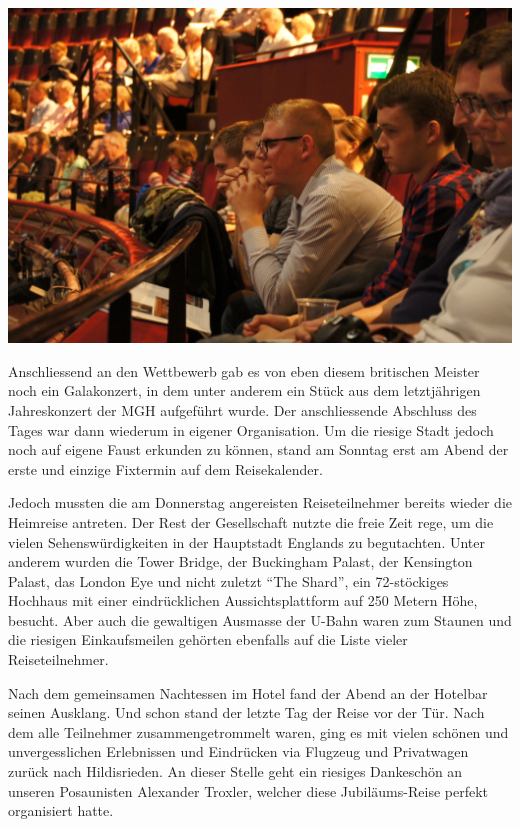\begin{history}
    \begin{MulticolFigure}
        \centering
        \includegraphics[width=0.93\linewidth]{./chap/2001-2024/2014/Britisch-Open-Royal-Alber-Hall.jpg}
    \end{MulticolFigure}

    Anschliessend an den Wettbewerb gab es von eben diesem britischen Meister
    noch ein Galakonzert, in dem unter anderem ein Stück aus dem letztjährigen
    Jahreskonzert der MGH aufgeführt wurde. Der anschliessende Abschluss des
    Tages war dann wiederum in eigener Organisation. Um die riesige Stadt jedoch
    noch auf eigene Faust erkunden zu können, stand am Sonntag erst am Abend der
    erste und einzige Fixtermin auf dem Reisekalender.

    Jedoch mussten die am Donnerstag angereisten Reiseteilnehmer bereits wieder
    die Heimreise antreten. Der Rest der Gesellschaft nutzte die freie Zeit
    rege, um die vielen Sehenswürdigkeiten in der Hauptstadt Englands zu
    begutachten. Unter anderem wurden die Tower Bridge, der Buckingham Palast,
    der Kensington Palast, das London Eye und nicht zuletzt \enquote{The Shard},
    ein 72-stöckiges Hochhaus mit einer eindrücklichen Aussichtsplattform auf
    250 Metern Höhe, besucht. Aber auch die gewaltigen Ausmasse der U-Bahn waren
    zum Staunen und die riesigen Einkaufsmeilen gehörten ebenfalls auf die Liste
    vieler Reiseteilnehmer.

    Nach dem gemeinsamen Nachtessen im Hotel fand der Abend an der Hotelbar
    seinen Ausklang. Und schon stand der letzte Tag der Reise vor der Tür. Nach
    dem alle Teilnehmer zusammengetrommelt waren, ging es mit vielen schönen und
    unvergesslichen Erlebnissen und Eindrücken via Flugzeug und Privatwagen
    zurück nach Hildisrieden. An dieser Stelle geht ein riesiges Dankeschön an
    unseren Posaunisten Alexander Troxler, welcher diese Jubiläums-Reise perfekt
    organisiert hatte.

\end{history}


